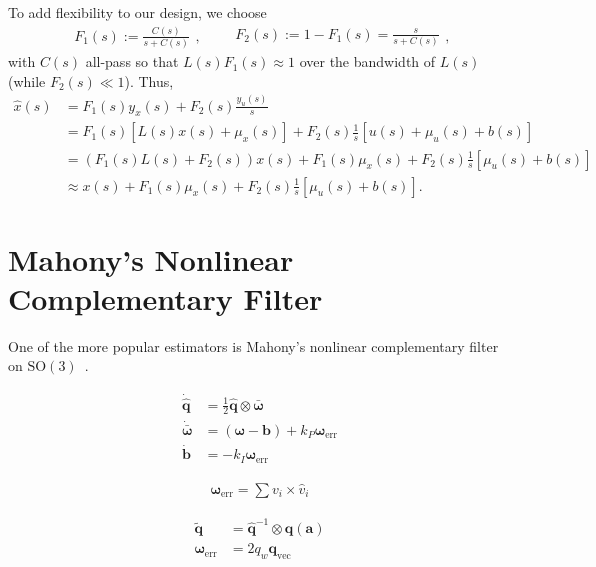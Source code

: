 \documentclass[a4paper]{article}
\begin{document}
To add flexibility to our design, we choose
\begin{equation}
\begin{split}
F_1(s) := \frac{C(s)}{s + C(s)}
\end{split},
\qquad
\begin{split}
F_2(s) := 1 - F_1(s) = \frac{s}{s + C(s)}
\end{split},
\end{equation}
with $C(s)$ all-pass so that $L(s)F_1(s)\approx1$ over the bandwidth of $L(s)$ (while $F_2(s)\ll1$).
Thus,
\begin{align}
\hat{x}(s) &= F_1(s)y_x(s) + F_2(s)\frac{y_u(s)}{s} \nonumber \\
           &= F_1(s)\left[L(s)x(s) + \mu_x(s)\right] + F_2(s)\frac{1}{s}\left[u(s) + \mu_u(s) + b(s)\right] \nonumber \\
           &= (F_1(s)L(s)+F_2(s))x(s) + F_1(s)\mu_x(s) + F_2(s)\frac{1}{s}\left[\mu_u(s) + b(s)\right] \nonumber \\
           &\approx x(s) + F_1(s)\mu_x(s) + F_2(s)\frac{1}{s}\left[\mu_u(s) + b(s)\right].
\end{align}

\section*{Mahony's Nonlinear Complementary Filter}
One of the more popular estimators is Mahony's nonlinear complementary filter on $\mathrm{SO}(3)$~\cite{Mahony2008}.

\begin{align}
  \dot{\bm{\hat{q}}} &= \frac{1}{2} \hat{\bm q} \otimes \bm{\bar \omega} \\
  \dot{\bm{\bar \omega}} &= (\bm{\omega} - \bm{b}) + k_P\bm{\omega}_\text{err} \\
  \dot{\bm{b}} &= -k_I\bm{\omega}_\text{err}
\end{align}

\begin{align}
  \bm{\omega}_\text{err} = \sum v_i \times \hat{v}_i
\end{align}

\begin{align}
  \tilde{\bm{q}} &= \hat{\bm q}^{-1} \otimes \bm{q}(\bm{a}) \\
  \bm{\omega}_\text{err} &= 2 q_w \bm{q}_\text{vec}
\end{align}
\end{document}
